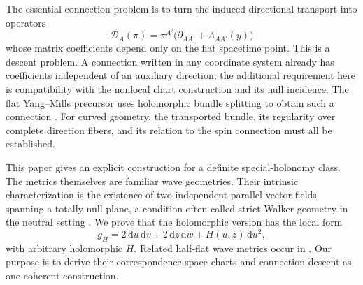 \documentclass[11pt]{article}
\numberwithin{equation}{section}
\theoremstyle{definition}
\theoremstyle{remark}
\newcommand{\dd}{\mathrm d}
\begin{document}
The essential connection problem is to turn the induced directional transport into operators
\begin{equation}\label{eq:target}
\mathcal D_A(\pi)=\pi^{A'}\bigl(\partial_{AA'}+A_{AA'}(y)\bigr)
\end{equation}
whose matrix coefficients depend only on the flat spacetime point. This is a descent problem. A connection written in any coordinate system already has coefficients independent of an auxiliary direction; the additional requirement here is compatibility with the nonlocal chart construction and its null incidence. The flat Yang--Mills precursor uses holomorphic bundle splitting to obtain such a connection \cite{Baker}. For curved geometry, the transported bundle, its regularity over complete direction fibers, and its relation to the spin connection must all be established.

This paper gives an explicit construction for a definite special-holonomy class. The metrics themselves are familiar wave geometries. Their intrinsic characterization is the existence of two independent parallel vector fields spanning a totally null plane, a condition often called strict Walker geometry in the neutral setting \cite{DRGV}. We prove that the holomorphic version has the local form
\begin{equation}\label{eq:wave-intro}
g_H=2\,\dd u\,\dd v+2\,\dd z\,\dd w+H(u,z)\,\dd u^2,
\end{equation}
with arbitrary holomorphic $H$. Related half-flat wave metrics occur in \cite{BGS}. Our purpose is to derive their correspondence-space charts and connection descent as one coherent construction.
\end{document}
